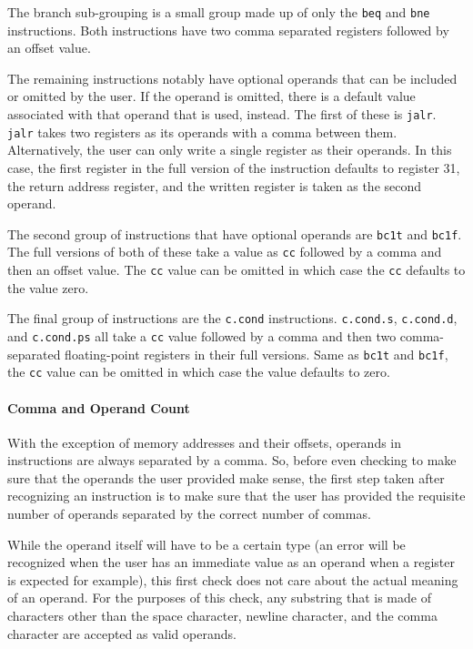 \documentclass[
    paper=letter,
    parskip=half,
    fontsize=12pt,
    titlepage=firstiscover,
    toc=bibliography,
    numbers=endperiod
]{scrartcl}
\begin{document}
The branch sub-grouping is a small group made up of only the
\texttt{beq} and \texttt{bne} instructions. Both instructions have two
comma separated registers followed by an offset value.

The remaining instructions notably have optional operands that can be
included or omitted by the user. If the operand is omitted, there is a
default value associated with that operand that is used, instead. The
first of these is \texttt{jalr}. \texttt{jalr} takes two registers as
its operands with a comma between them. Alternatively, the user can only
write a single register as their operands. In this case, the first
register in the full version of the instruction defaults to register 31,
the return address register, and the written register is taken as the
second operand.

The second group of instructions that have optional operands are
\texttt{bc1t} and \texttt{bc1f}. The full versions of both of these take
a value as \texttt{cc} followed by a comma and then an offset value. The
\texttt{cc} value can be omitted in which case the \texttt{cc} defaults
to the value zero.

The final group of instructions are the \texttt{c.cond} instructions.
\texttt{c.cond.s}, \texttt{c.cond.d}, and \texttt{c.cond.ps} all take a
\texttt{cc} value followed by a comma and then two comma-separated
floating-point registers in their full versions. Same as \texttt{bc1t}
and \texttt{bc1f}, the \texttt{cc} value can be omitted in which case
the value defaults to zero.

\paragraph{Comma and Operand Count}
\label{subsec:comma-and-operand-count}

With the exception of memory addresses and their offsets, operands in
instructions are always separated by a comma. So, before even checking
to make sure that the operands the user provided make sense, the first
step taken after recognizing an instruction is to make sure that the
user has provided the requisite number of operands separated by the
correct number of commas.

While the operand itself will have to be a certain type (an error will
be recognized when the user has an immediate value as an operand when a
register is expected for example), this first check does not care about
the actual meaning of an operand. For the purposes of this check, any
substring that is made of characters other than the space character,
newline character, and the comma character are accepted as valid
operands.
\end{document}
